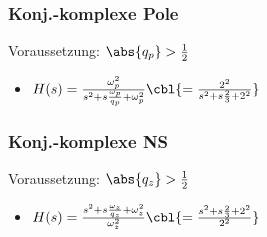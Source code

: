 \begin{minipage}[t]{0.48\columnwidth}
    \raggedright
    \subsubsection{Konj.-komplexe Pole}

    Voraussetzung: $\abs{q_p} > \frac{1}{2}$\\
    \begin{itemize}
        \item $H(s) = \frac{\omega_p^2}{s^2 + s \frac{\omega_p}{q_p} + \omega_p^2} \cbl{= \frac{2^2}{s^2 + s \frac{2}{3} + 2^2}}$\\
    \end{itemize}

\end{minipage}
\hfill
\begin{minipage}[t]{0.48\columnwidth}
    \raggedright
    \subsubsection{Konj.-komplexe NS} 

    Voraussetzung: $\abs{q_z} > \frac{1}{2}$
    \begin{itemize}
        \item $H(s) = \frac{s^2 + s \frac{\omega_z}{q_z} + \omega_z^2}{\omega_z^2} \cbl{= \frac{s^2 + s \frac{2}{3} + 2^2}{2^2}}$\\
    \end{itemize}
\end{minipage}

